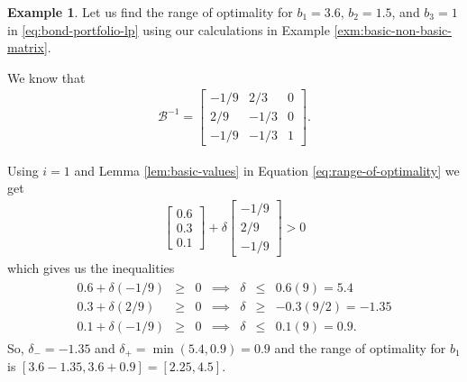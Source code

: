 \documentclass[
]{book}
\theoremstyle{definition}
\theoremstyle{definition}
\newtheorem{example}{Example}[chapter]
\theoremstyle{definition}
\theoremstyle{definition}
\theoremstyle{remark}
\begin{document}
\begin{example}
Let us find the range of optimality for \(b_1 = 3.6\), \(b_2=1.5\), and \(b_3 = 1\) in \eqref{eq:bond-portfolio-lp} using our calculations in Example \ref{exm:basic-non-basic-matrix}.

We know that
\begin{align*}
  \mathcal{B}^{-1} = 
    \begin{bmatrix}
    -1/9 & 2/3 & 0 \\
    2/9 & -1/3 & 0 \\
    -1/9 & -1/3 & 1
    \end{bmatrix}.
\end{align*}

Using \(i = 1\) and Lemma \ref{lem:basic-values} in Equation \eqref{eq:range-of-optimality} we get
\begin{align*}
  \begin{bmatrix} 0.6 \\ 0.3 \\ 0.1 \end{bmatrix} 
  + \delta
  \begin{bmatrix}
    -1/9 \\ 
    2/9 \\
    -1/9
  \end{bmatrix} > 0
\end{align*}
which gives us the inequalities
\begin{align*}
  \begin{array}{lrlrrll}
    0.6 + \delta (-1/9) &\ge & 0 & \implies & \delta &\le & 0.6 (9) = 5.4 \\
    0.3 + \delta (2/9) &\ge & 0 & \implies & \delta &\ge & -0.3 (9/2) = -1.35  \\
    0.1 + \delta (-1/9) &\ge & 0 & \implies & \delta & \le & 0.1 (9) = 0.9.  
  \end{array}
\end{align*}
So, \(\delta_- = -1.35\) and \(\delta_+ = \min(5.4, 0.9) = 0.9\) and the range of optimality for \(b_1\) is \([3.6 - 1.35, 3.6 + 0.9] = [2.25, 4.5]\).


\end{example}
\end{document}
